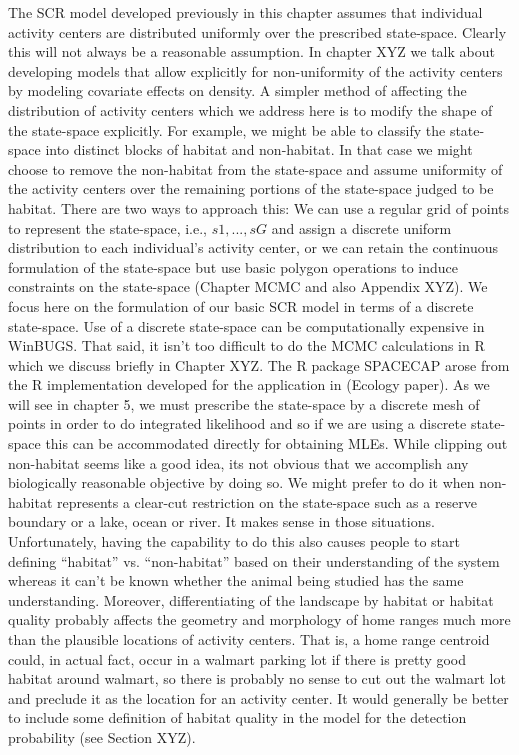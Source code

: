 The SCR model developed previously in this chapter assumes that individual activity centers are distributed uniformly over the prescribed state-space. Clearly this will not always be a reasonable assumption. In chapter XYZ we talk about developing models that allow explicitly for non-uniformity of the activity centers by modeling covariate effects on density. A simpler method of affecting the distribution of activity centers which we address here is to modify the shape of the state-space explicitly. For example, we might be able to classify the state-space into distinct blocks of habitat and non-habitat. In that case we might choose to remove the non-habitat from the state-space and assume uniformity of the activity centers over the remaining portions of the state-space judged to be habitat. 
There are two ways to approach this: We can use a regular grid of points to represent the state-space, i.e., $s1, ... , sG$ and assign a discrete uniform distribution to each individual's activity center, or we can retain the continuous formulation of the state-space but use basic polygon operations to induce constraints on the state-space (Chapter MCMC and also Appendix XYZ). We focus here on the formulation of our basic SCR model in terms of a discrete state-space. 
Use of a discrete state-space can be computationally expensive in
WinBUGS. That said, it isn't too difficult to do the MCMC calculations
in R which we discuss briefly in Chapter XYZ. The R package SPACECAP
\citep{gopalaswamy_etal:2011} arose from the R implementation
developed for the application in \citet{royle_etal:2009} (Ecology paper).  As we will see in chapter 5, we must prescribe the state-space by a discrete mesh of points in order to do integrated likelihood and so if we are using a discrete state-space this can be accommodated directly for obtaining MLEs. 
While clipping out non-habitat seems like a good idea, its not obvious that we accomplish any biologically reasonable objective by doing so. We might prefer to do it when non-habitat represents a clear-cut restriction on the state-space such as a reserve boundary or a lake, ocean or river. It makes sense in those situations.  Unfortunately, having the capability to do this also causes people to start defining ``habitat'' vs. ``non-habitat'' based on their understanding of the system whereas it can't be known whether the animal being studied has the same understanding. Moreover, differentiating of the landscape by habitat or habitat quality probably affects the geometry and morphology of home ranges much more than the plausible locations of activity centers. That is, a home range centroid could, in actual fact, occur in a walmart parking lot if there is pretty good habitat around walmart, so there is probably no sense to cut out the walmart lot and preclude it as the location for an activity center.  It would generally be better to include some definition of habitat quality in the model for the detection probability (see Section XYZ).


